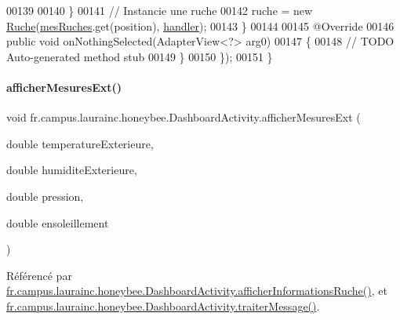 \begin{DoxyCode}
00139 
00140                 \}
00141                 \textcolor{comment}{// Instancie une ruche}
00142                 ruche = \textcolor{keyword}{new} \hyperlink{class_ruche}{Ruche}(\hyperlink{classfr_1_1campus_1_1laurainc_1_1honeybee_1_1_dashboard_activity_a85c92d113540b2ae3c20077050f1a90b}{mesRuches}.get(position), \hyperlink{classfr_1_1campus_1_1laurainc_1_1honeybee_1_1_dashboard_activity_a7dd06030cd3afe35ace9a5e2f9e789dd}{handler});
00143             \}
00144 
00145             @Override
00146             \textcolor{keyword}{public} \textcolor{keywordtype}{void} onNothingSelected(AdapterView<?> arg0)
00147             \{
00148                 \textcolor{comment}{// TODO Auto-generated method stub}
00149             \}
00150         \});
00151     \}
\end{DoxyCode}
\mbox{\label{classfr_1_1campus_1_1laurainc_1_1honeybee_1_1_dashboard_activity_afffb9de4776b6c6cea676a08251a58ba}} 
\paragraph{\texorpdfstring{afficher\+Mesures\+Ext()}{afficherMesuresExt()}\hspace{0.1cm}{\footnotesize\ttfamily [1/2]}}
{\footnotesize\ttfamily void fr.\+campus.\+laurainc.\+honeybee.\+Dashboard\+Activity.\+afficher\+Mesures\+Ext (\begin{DoxyParamCaption}\item[{double}]{temperature\+Exterieure,  }\item[{double}]{humidite\+Exterieure,  }\item[{double}]{pression,  }\item[{double}]{ensoleillement }\end{DoxyParamCaption})\hspace{0.3cm}{\ttfamily [private]}}



Référencé par \hyperlink{classfr_1_1campus_1_1laurainc_1_1honeybee_1_1_dashboard_activity_a88f00531bee33bd6c47b33f5ac4df9ed}{fr.\+campus.\+laurainc.\+honeybee.\+Dashboard\+Activity.\+afficher\+Informations\+Ruche()}, et \hyperlink{classfr_1_1campus_1_1laurainc_1_1honeybee_1_1_dashboard_activity_a50d4c14e993ff1779ae5dce8cee11216}{fr.\+campus.\+laurainc.\+honeybee.\+Dashboard\+Activity.\+traiter\+Message()}.


